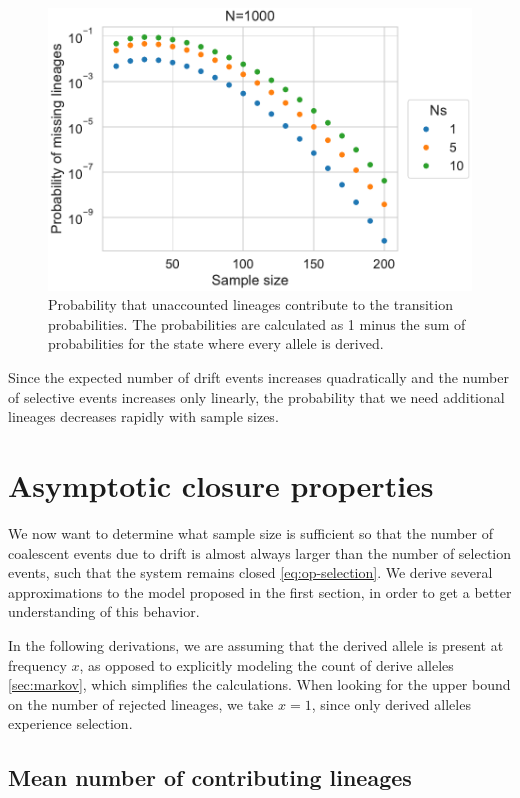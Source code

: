 \documentclass[review]{elsarticle}
\begin{document}
\begin{figure}
  \centering
  \includegraphics[]{fig/missing.pdf}
  \caption{Probability that unaccounted lineages contribute to the transition probabilities. The
    probabilities are calculated as 1 minus the sum of probabilities for the state where every
    allele is derived.}
  \label{fig:missing}
\end{figure}

Since the expected number of drift events increases quadratically and the number of selective events
increases only linearly, the probability that we need additional lineages decreases rapidly with
sample sizes.

\section{Asymptotic closure properties}

We now want to determine what sample size is sufficient so that the number of coalescent events due
to drift is almost always larger than the number of selection events, such that the system remains
closed \eqref{eq:op-selection}. We derive several approximations to the model proposed in the first
section, in order to get a better understanding of this behavior.

In the following derivations, we are assuming that the derived allele is present at frequency $x$,
as opposed to explicitly modeling the count of derive alleles \ref{sec:markov}, which simplifies the
calculations. When looking for the upper bound on the number of rejected lineages, we take $x=1$,
since only derived alleles experience selection.

\subsection{Mean number of contributing lineages}
\label{sec:mean-contr}
\end{document}
